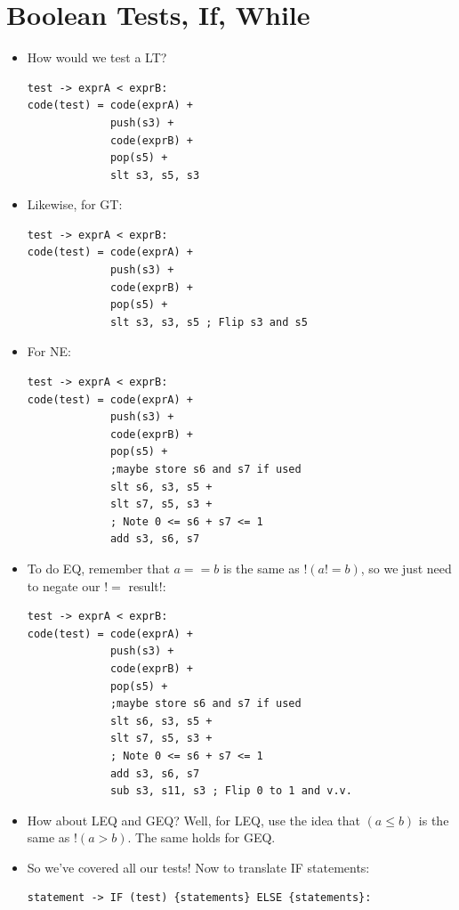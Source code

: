 \documentclass[12pt]{article}
\begin{document}
\section{Boolean Tests, If, While}
\begin{itemize}
    \item How would we test a LT?
\begin{lstlisting}[mathescape, numbers=none, breaklines=true]
test -> exprA < exprB:
code(test) = code(exprA) +
             push(s3) + 
             code(exprB) +
             pop(s5) +
             slt s3, s5, s3
\end{lstlisting}
    \item Likewise, for GT:
\begin{lstlisting}[mathescape, numbers=none, breaklines=true]
test -> exprA < exprB:
code(test) = code(exprA) +
             push(s3) + 
             code(exprB) +
             pop(s5) +
             slt s3, s3, s5 ; Flip s3 and s5
\end{lstlisting}
    \item For NE:
\begin{lstlisting}[mathescape, numbers=none, breaklines=true]
test -> exprA < exprB:
code(test) = code(exprA) +
             push(s3) + 
             code(exprB) +
             pop(s5) +
             ;maybe store s6 and s7 if used
             slt s6, s3, s5 +
             slt s7, s5, s3 +
             ; Note 0 <= s6 + s7 <= 1
             add s3, s6, s7
\end{lstlisting}
    \item To do EQ, remember that $a == b$ is the same as $!(a != b)$, so we just need to negate our $!=$ result!:
\begin{lstlisting}[mathescape, numbers=none, breaklines=true]
test -> exprA < exprB:
code(test) = code(exprA) +
             push(s3) + 
             code(exprB) +
             pop(s5) +
             ;maybe store s6 and s7 if used
             slt s6, s3, s5 +
             slt s7, s5, s3 +
             ; Note 0 <= s6 + s7 <= 1
             add s3, s6, s7
             sub s3, s11, s3 ; Flip 0 to 1 and v.v.
\end{lstlisting}
    \item How about LEQ and GEQ?  Well, for LEQ, use the idea that $(a \leq b)$ is the same as $!(a > b)$.  The same holds for GEQ. 
    \item So we've covered all our tests!  Now to translate IF statements:
\begin{lstlisting}[mathescape, numbers=none, breaklines=true]
statement -> IF (test) {statements} ELSE {statements}:

\end{lstlisting}
\end{itemize}
\end{document}
